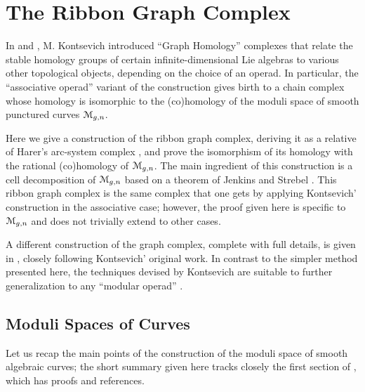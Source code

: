 

\chapter{The Ribbon Graph Complex}
\label{cha:ribbon-graph-complex}

In \cite{kontsevich;feynman} and \cite{kontsevich;1993}, M. Kontsevich
introduced ``Graph Homology'' complexes that relate the stable
homology groups of certain infinite-dimensional Lie algebras to
various other topological objects, depending on the choice of an
operad.  In particular, the ``associative operad'' variant of the
construction gives birth to a chain complex whose homology is
isomorphic to the (co)homology of the moduli space of smooth punctured
curves $\mathcal{M}_{g,n}$.

Here we give a construction of the ribbon graph complex, deriving it
as a relative of Harer's arc-system complex
\cite{harer;cohomological-dimension,
  harer;cohomology-of-moduli}, and prove the isomorphism of its homology
with the rational (co)homology of $\mathcal{M}_{g,n}$.  The main ingredient of
this construction is a cell decomposition of $\mathcal{M}_{g,n}$ based on a
theorem of Jenkins and Strebel
\cite{strebel;quadratic-differentials;1983}.  This ribbon graph
complex is the same complex that one gets by applying Kontsevich'
construction in the associative case; however, the proof given here is
specific to $\mathcal{M}_{g,n}$ and does not trivially extend to other cases.

A different construction of the graph complex, complete with full
details, is given in \cite{conant-vogtmann;2003}, closely following
Kontsevich' original work.  In contrast to the simpler method
presented here, the techniques devised by Kontsevich are suitable to
further generalization to any ``modular operad''
\cite{getzler-kapranov}.



\section{Moduli Spaces of Curves}
\label{sec:moduli-spaces}

Let us recap the main points of the construction of the moduli space
of smooth algebraic curves; the short summary given here tracks
closely the first section of \cite{looijenga;cellular-decomposition},
which has proofs and references.

